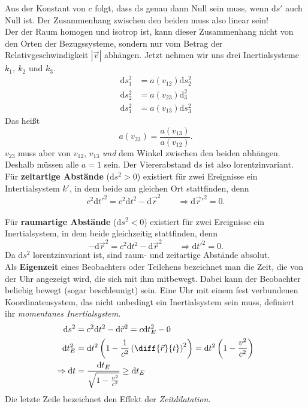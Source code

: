 Aus der Konstant von $c$ folgt, dass $\mathrm{d}s$ genau dann Null sein muss, wenn $\mathrm{d}s'$ auch Null ist. Der Zusammenhang zwischen den beiden muss also linear sein!\\
Der der Raum homogen und isotrop ist, kann dieser Zusammenhang nicht von den Orten der Bezugssysteme, sondern nur vom Betrag der Relativgeschwindigkeit $|\vec{v}|$ abhängen. Jetzt nehmen wir uns drei Inertialsysteme $k_1,\ k_2$ und $k_3$. 
\begin{align*}
\mathrm{d}s_1^2 &= a(v_{12})\mathrm{d}s_2^2\\
\mathrm{d}s_2^2&=a(v_{23})\mathrm{d}_3^2\\
\mathrm{d}s_1^2 &=a(v_{13})\mathrm{d}s_3^2
\end{align*}
Das heißt
\begin{equation*}
a(v_{23})=\frac{a(v_{13})}{a(v_{12})}.
\end{equation*}
$v_{23}$ muss aber von $v_{12}$, $v_{13}$ \emph{und} dem Winkel zwischen den beiden abhängen. Deshalb müssen alle $a=1$ sein. Der Viererabstand $\mathrm{d}s$ ist also lorentzinvariant.\\

Für \textbf{zeitartige Abstände} ($\mathrm{d}s^2>0$) existiert für zwei Ereignisse ein Intertialsystem $k'$, in dem beide am gleichen Ort stattfinden, denn
\begin{equation*}
c^2\mathrm{d}t'^2 = c^2\mathrm{d}t^2 - \mathrm{d}\vec{r}^2 \qquad \Rightarrow \mathrm{d}\vec{r}'^2 = 0.
\end{equation*} 
\ \\

Für \textbf{raumartige Abstände} ($\mathrm{d}s^2<0$) existiert für zwei Ereignisse ein Inertialsystem, in dem beide gleichzeitig stattfinden, denn
\begin{equation*}
-\mathrm{d}\vec{r}^2 =c^2\mathrm{d}t^2-\mathrm{d}\vec{r}^2 \qquad \Rightarrow \mathrm{d}t'^2 =0.
\end{equation*}
Da $\mathrm{d}s^2$ lorentzinvariant ist, sind raum- und zeitartige Abstände absolut.\\

Als \textbf{Eigenzeit} eines Beobachters oder Teilchens bezeichnet man die Zeit, die von der Uhr angezeigt wird, die sich mit ihm mitbewegt. Dabei kann der Beobachter beliebig bewegt (sogar beschleunigt) sein. Eine Uhr mit einem fest verbundenen Koordinatensystem, das nicht unbedingt ein Inertialsystem sein muss, definiert ihr \emph{momentanes Inertialsystem}.
\begin{align*}
\mathrm{d}s^2 &= c^2\mathrm{d}t^2 - \mathrm{d}\vec{r}^2 = c\mathrm{d}t_E^2-0\\
\mathrm{d}t_E^2 &= \mathrm{d}t^2\left(1-\frac{1}{c^2}\left(\diff{\vec{r}}{t}\right)^2\right)=\mathrm{d}t^2\left(1-\frac{v^2}{c^2}\right)\\
\Rightarrow \mathrm{d}t &= \frac{\mathrm{d}t_E}{\sqrt{1-\frac{v^2}{c^2}}}\geq \mathrm{d}t_E
\end{align*}
Die letzte Zeile bezeichnet den Effekt der \emph{Zeitdilatation}.\\ \linebreak


